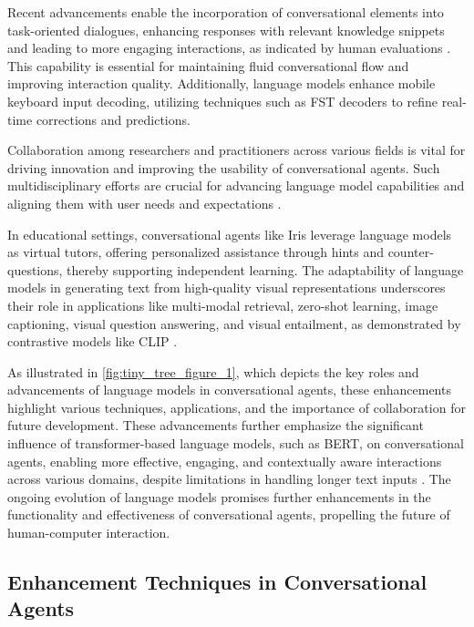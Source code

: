 Recent advancements enable the incorporation of conversational elements into task-oriented dialogues, enhancing responses with relevant knowledge snippets and leading to more engaging interactions, as indicated by human evaluations \cite{stricker2024enhancingtaskorienteddialogueschitchat}. This capability is essential for maintaining fluid conversational flow and improving interaction quality. Additionally, language models enhance mobile keyboard input decoding, utilizing techniques such as FST decoders to refine real-time corrections and predictions.

Collaboration among researchers and practitioners across various fields is vital for driving innovation and improving the usability of conversational agents. Such multidisciplinary efforts are crucial for advancing language model capabilities and aligning them with user needs and expectations \cite{korre2023takesvillagemultidisciplinaritycollaboration}.

In educational settings, conversational agents like Iris leverage language models as virtual tutors, offering personalized assistance through hints and counter-questions, thereby supporting independent learning. The adaptability of language models in generating text from high-quality visual representations underscores their role in applications like multi-modal retrieval, zero-shot learning, image captioning, visual question answering, and visual entailment, as demonstrated by contrastive models like CLIP \cite{zhang2024universaladversarialperturbationsvisionlanguage,Hierarchic2}.

As illustrated in \autoref{fig:tiny_tree_figure_1}, which depicts the key roles and advancements of language models in conversational agents, these enhancements highlight various techniques, applications, and the importance of collaboration for future development. These advancements further emphasize the significant influence of transformer-based language models, such as BERT, on conversational agents, enabling more effective, engaging, and contextually aware interactions across various domains, despite limitations in handling longer text inputs \cite{ginzburg2021selfsuperviseddocumentsimilarityranking}. The ongoing evolution of language models promises further enhancements in the functionality and effectiveness of conversational agents, propelling the future of human-computer interaction.


\subsection{Enhancement Techniques in Conversational Agents} \label{subsec:Enhancement Techniques in Conversational Agents}

